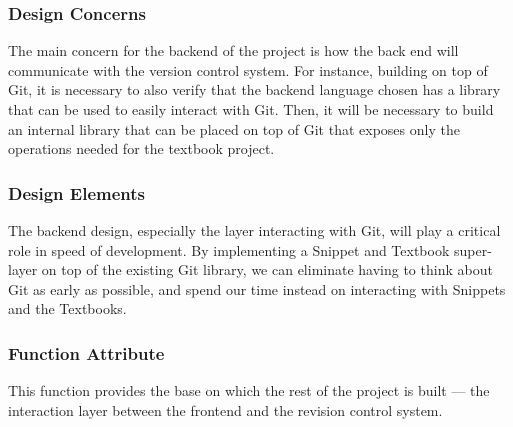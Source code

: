 \documentclass[letterpaper, 10pt, draftclsnofoot, compsoc, onecolumn]{IEEEtran}
\begin{document}
\subsubsection{Design Concerns}
The main concern for the backend of the project is how the back end will communicate
with the version control system. For instance, building on top of Git, it is
necessary to also verify that the backend language chosen has a library that can
be used to easily interact with Git. Then, it will be necessary to build an internal
library that can be placed on top of Git that exposes only the operations needed
for the textbook project.
{\noindent  \par}

\subsubsection{Design Elements}
{\noindent
The backend design, especially the layer interacting with Git, will play a critical
role in speed of development. By implementing a Snippet and Textbook super-layer
on top of the existing Git library, we can eliminate having to think about Git
as early as possible, and spend our time instead on interacting with Snippets and
the Textbooks.
\par}

\subsubsection{Function Attribute}
{\noindent This function provides the base on which the rest of the project is
built — the interaction layer between the frontend and the revision control system. \par}
\end{document}
